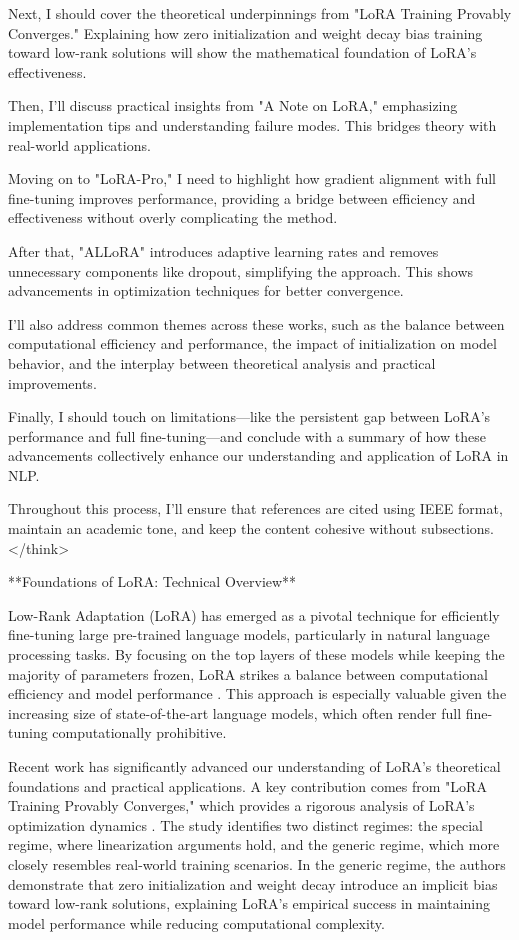 \documentclass[conference]{IEEEtran}
\begin{document}
Next, I should cover the theoretical underpinnings from "LoRA Training Provably Converges." Explaining how zero initialization and weight decay bias training toward low-rank solutions will show the mathematical foundation of LoRA's effectiveness.

Then, I'll discuss practical insights from "A Note on LoRA," emphasizing implementation tips and understanding failure modes. This bridges theory with real-world applications.

Moving on to "LoRA-Pro," I need to highlight how gradient alignment with full fine-tuning improves performance, providing a bridge between efficiency and effectiveness without overly complicating the method.

After that, "ALLoRA" introduces adaptive learning rates and removes unnecessary components like dropout, simplifying the approach. This shows advancements in optimization techniques for better convergence.

I'll also address common themes across these works, such as the balance between computational efficiency and performance, the impact of initialization on model behavior, and the interplay between theoretical analysis and practical improvements.

Finally, I should touch on limitations—like the persistent gap between LoRA's performance and full fine-tuning—and conclude with a summary of how these advancements collectively enhance our understanding and application of LoRA in NLP.

Throughout this process, I'll ensure that references are cited using IEEE format, maintain an academic tone, and keep the content cohesive without subsections.
</think>

**Foundations of LoRA: Technical Overview**

Low-Rank Adaptation (LoRA) has emerged as a pivotal technique for efficiently fine-tuning large pre-trained language models, particularly in natural language processing tasks. By focusing on the top layers of these models while keeping the majority of parameters frozen, LoRA strikes a balance between computational efficiency and model performance \cite{bX}. This approach is especially valuable given the increasing size of state-of-the-art language models, which often render full fine-tuning computationally prohibitive.

Recent work has significantly advanced our understanding of LoRA's theoretical foundations and practical applications. A key contribution comes from "LoRA Training Provably Converges," which provides a rigorous analysis of LoRA's optimization dynamics \cite{bX}. The study identifies two distinct regimes: the special regime, where linearization arguments hold, and the generic regime, which more closely resembles real-world training scenarios. In the generic regime, the authors demonstrate that zero initialization and weight decay introduce an implicit bias toward low-rank solutions, explaining LoRA's empirical success in maintaining model performance while reducing computational complexity.
\end{document}
